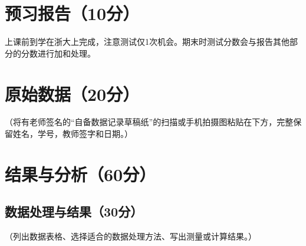 \documentclass[]{../template/Report}%
\begin{document}
\maketitle%

\section{预习报告（10分）}
上课前到学在浙大上完成，注意测试仅1次机会。期末时测试分数会与报告其他部分的分数进行加和处理。

\section{原始数据（20分）}
（将有老师签名的“自备数据记录草稿纸”的扫描或手机拍摄图粘贴在下方，完整保留姓名，学号，教师签字和日期。）

\section{结果与分析（60分）}
\subsection{数据处理与结果（30分）}
（列出数据表格、选择适合的数据处理方法、写出测量或计算结果。）
\end{document}
